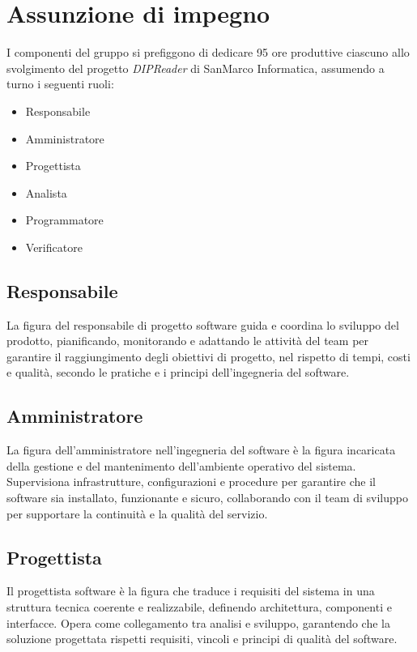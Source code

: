 \documentclass[a4paper,12pt]{article}
\begin{document}
\vspace{0.5cm}
\section{Assunzione di impegno}
I componenti del gruppo si prefiggono di dedicare 95 ore produttive ciascuno allo svolgimento del progetto \textit{DIPReader} di SanMarco Informatica, assumendo a turno i seguenti ruoli:
\begin{itemize} [noitemsep]
    \item Responsabile
    \item Amministratore
    \item Progettista
    \item Analista
    \item Programmatore
    \item Verificatore
\end{itemize}

\subsection*{Responsabile}
La figura del responsabile di progetto software guida e coordina lo sviluppo del prodotto, pianificando, monitorando e adattando le attività del team per garantire il raggiungimento degli obiettivi di progetto, nel rispetto di tempi, costi e qualità, secondo le pratiche e i principi dell'ingegneria del software.

\subsection*{Amministratore}
La figura dell'amministratore nell'ingegneria del software è la figura incaricata della gestione e del mantenimento dell'ambiente operativo del sistema. Supervisiona infrastrutture, configurazioni e procedure per garantire che il software sia installato, funzionante e sicuro, collaborando con il team di sviluppo per supportare la continuità e la qualità del servizio.

\subsection*{Progettista}
Il progettista software è la figura che traduce i requisiti del sistema in una struttura tecnica coerente e realizzabile, definendo architettura, componenti e interfacce. Opera come collegamento tra analisi e sviluppo, garantendo che la soluzione progettata rispetti requisiti, vincoli e principi di qualità del software.
\end{document}
